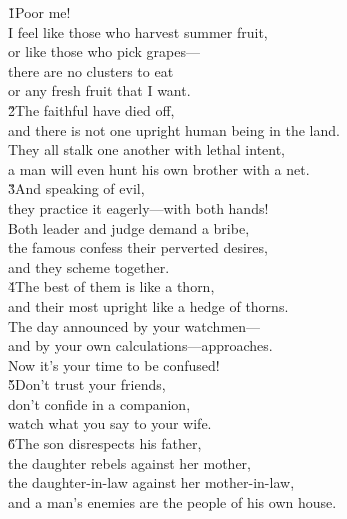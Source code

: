 \begin{poetry}
\poeml {}
\v{1}Poor me! \\
\poeml I feel like those who harvest summer fruit, \\
\poemlll       or like those who pick grapes--- \\
\poeml there are no clusters to eat \\
\poemll    or any fresh fruit that I want. \\
\poeml \v{2}The faithful have died off, \\
\poemll    and there is not one upright human being in the land. \\
\poeml They all stalk one another with lethal intent, \\
\poemll    a man will even hunt his own brother with a net. \\
\poeml \v{3}And speaking of evil, \\
\poemll    they practice it eagerly---with both hands! \\
\poeml Both leader and judge demand a bribe, \\
\poemll    the famous confess their perverted desires, \\
\poemlll       and they scheme together. \\
\poeml \v{4}The best of them is like a thorn, \\
\poemll    and their most upright like a hedge of thorns. \\
\poeml The day announced by your watchmen--- \\
\poemll    and by your own calculations---approaches. \\
\poemlll       Now it's your time to be confused! \\
\poeml \v{5}Don't trust your friends, \\
\poemll    don't confide in a companion, \\
\poemlll       watch what you say to your wife. \\
\poeml \v{6}The son disrespects his father, \\
\poemll    the daughter rebels against her mother, \\
\poeml the daughter-in-law against her mother-in-law, \\
\poemll    and a man's enemies are the people of his own house.

\end{poetry}
